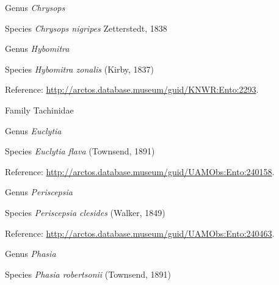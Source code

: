 \documentclass[9pt, article]{memoir}
\begin{document}
\begin{multicols}{2}
\vspace{6pt}\noindent\hspace{30pt}Genus \textit{Chrysops}


\vspace{6pt}\noindent\hspace{36pt}Species \textit{Chrysops nigripes} Zetterstedt, 1838


\vspace{6pt}\noindent\hspace{30pt}Genus \textit{Hybomitra}


\vspace{6pt}\noindent\hspace{36pt}Species \textit{Hybomitra zonalis} (Kirby, 1837)


\vspace{6pt}Reference: 
\url{http://arctos.database.museum/guid/KNWR:Ento:2293}.

\vspace{6pt}\noindent\hspace{24pt}Family Tachinidae


\vspace{6pt}\noindent\hspace{30pt}Genus \textit{Euclytia}


\vspace{6pt}\noindent\hspace{36pt}Species \textit{Euclytia flava} (Townsend, 1891)


\vspace{6pt}Reference: 
\url{http://arctos.database.museum/guid/UAMObs:Ento:240158}.

\vspace{6pt}\noindent\hspace{30pt}Genus \textit{Periscepsia}


\vspace{6pt}\noindent\hspace{36pt}Species \textit{Periscepsia clesides} (Walker, 1849)


\vspace{6pt}Reference: 
\url{http://arctos.database.museum/guid/UAMObs:Ento:240463}.

\vspace{6pt}\noindent\hspace{30pt}Genus \textit{Phasia}


\vspace{6pt}\noindent\hspace{36pt}Species \textit{Phasia robertsonii} (Townsend, 1891)



\end{multicols}
\end{document}

